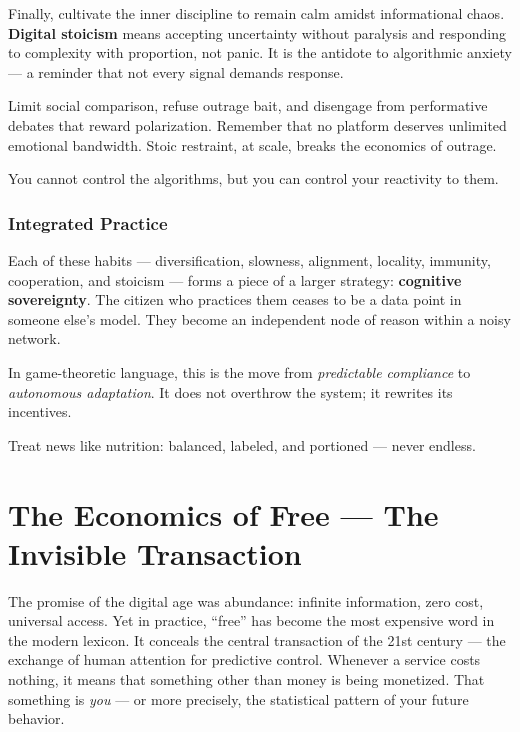 \documentclass[12pt,twoside]{book}
\begin{document}
Finally, cultivate the inner discipline to remain calm amidst informational chaos.  
\textbf{Digital stoicism} means accepting uncertainty without paralysis and responding to complexity with proportion, not panic.  
It is the antidote to algorithmic anxiety --- a reminder that not every signal demands response.

Limit social comparison, refuse outrage bait, and disengage from performative debates that reward polarization.  
Remember that no platform deserves unlimited emotional bandwidth.  
Stoic restraint, at scale, breaks the economics of outrage. \\

\begin{keyidea}
You cannot control the algorithms, but you can control your reactivity to them.
\end{keyidea}

\subsection*{Integrated Practice}

Each of these habits --- diversification, slowness, alignment, locality, immunity, cooperation, and stoicism --- forms a piece of a larger strategy: \textbf{cognitive sovereignty}.  
The citizen who practices them ceases to be a data point in someone else’s model.  
They become an independent node of reason within a noisy network.

In game-theoretic language, this is the move from \emph{predictable compliance} to \emph{autonomous adaptation}.  
It does not overthrow the system; it rewrites its incentives. \\

\begin{keyidea}
Treat news like nutrition: balanced, labeled, and portioned — never endless.
\end{keyidea}
\chapter{The Economics of Free — The Invisible Transaction}

The promise of the digital age was abundance: infinite information, zero cost, universal access.  
Yet in practice, “free” has become the most expensive word in the modern lexicon.  
It conceals the central transaction of the 21st century --- the exchange of human attention for predictive control.  
Whenever a service costs nothing, it means that something other than money is being monetized.  
That something is \emph{you} --- or more precisely, the statistical pattern of your future behavior. \\
\end{document}
